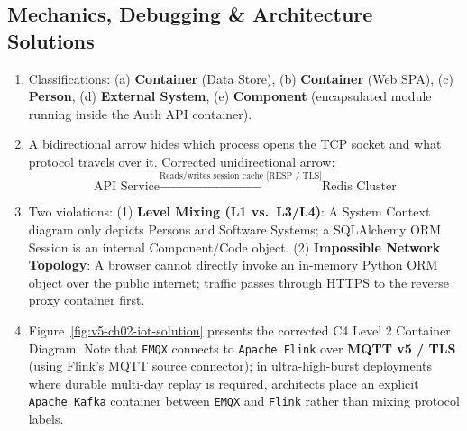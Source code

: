 \subsection*{Mechanics, Debugging \& Architecture Solutions}
\begin{enumerate}[label=\textbf{Solution~\thechapter.\arabic*}, leftmargin=*]
  \item Classifications: (a) \textbf{Container} (Data Store), (b) \textbf{Container} (Web SPA), (c) \textbf{Person}, (d) \textbf{External System}, (e) \textbf{Component} (encapsulated module running inside the Auth API container).
  \item A bidirectional arrow hides which process opens the TCP socket and what protocol travels over it. Corrected unidirectional arrow:
  $$\text{API Service} \xrightarrow{\text{Reads/writes session cache [RESP / TLS]}} \text{Redis Cluster}$$
  \item Two violations: (1) \textbf{Level Mixing (L1 vs.\ L3/L4)}: A System Context diagram only depicts Persons and Software Systems; a SQLAlchemy ORM Session is an internal Component/Code object. (2) \textbf{Impossible Network Topology}: A browser cannot directly invoke an in-memory Python ORM object over the public internet; traffic passes through HTTPS to the reverse proxy container first.
  \item Figure~\ref{fig:v5-ch02-iot-solution} presents the corrected C4 Level 2 Container Diagram. Note that \texttt{EMQX} connects to \texttt{Apache Flink} over \textbf{MQTT v5 / TLS} (using Flink's MQTT source connector); in ultra-high-burst deployments where durable multi-day replay is required, architects place an explicit \texttt{Apache Kafka} container between \texttt{EMQX} and \texttt{Flink} rather than mixing protocol labels.
\end{enumerate}

